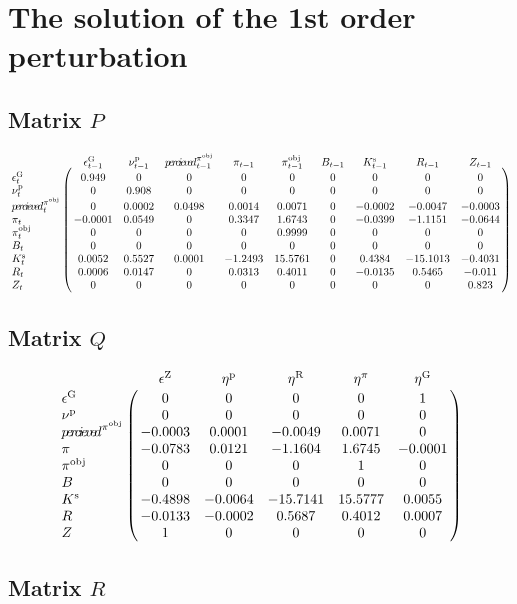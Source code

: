 \section{The solution of the 1st order perturbation}

\subsection*{Matrix $P$}

$$\bordermatrix{
~ & \epsilon^{\mathrm{G}}_{t-1} & \nu^{\mathrm{p}}_{t-1} & {p\!e\!r\!c\!i\!e\!v\!e\!d}^{\pi^{\mathrm{obj}}}_{t-1} & \pi_{t-1} & \pi^{\mathrm{obj}}_{t-1} & B_{t-1} & K^{\mathrm{s}}_{t-1} & R_{t-1} & Z_{t-1} \cr
\epsilon^{\mathrm{G}}_{t} & 0.949 & 0 & 0 & 0 & 0 & 0 & 0 & 0 & 0 \cr
\nu^{\mathrm{p}}_{t} & 0 & 0.908 & 0 & 0 & 0 & 0 & 0 & 0 & 0 \cr
{p\!e\!r\!c\!i\!e\!v\!e\!d}^{\pi^{\mathrm{obj}}}_{t} & 0 & 0.0002 & 0.0498 & 0.0014 & 0.0071 & 0 & -0.0002 & -0.0047 & -0.0003 \cr
\pi_{t} & -0.0001 & 0.0549 & 0 & 0.3347 & 1.6743 & 0 & -0.0399 & -1.1151 & -0.0644 \cr
\pi^{\mathrm{obj}}_{t} & 0 & 0 & 0 & 0 & 0.9999 & 0 & 0 & 0 & 0 \cr
B_{t} & 0 & 0 & 0 & 0 & 0 & 0 & 0 & 0 & 0 \cr
K^{\mathrm{s}}_{t} & 0.0052 & 0.5527 & 0.0001 & -1.2493 & 15.5761 & 0 & 0.4384 & -15.1013 & -0.4031 \cr
R_{t} & 0.0006 & 0.0147 & 0 & 0.0313 & 0.4011 & 0 & -0.0135 & 0.5465 & -0.011 \cr
Z_{t} & 0 & 0 & 0 & 0 & 0 & 0 & 0 & 0 & 0.823 \cr
}$$

\subsection*{Matrix $Q$}

$$\bordermatrix{
~ & \epsilon^{\mathrm{Z}} & \eta^{\mathrm{p}} & \eta^{\mathrm{R}} & \eta^{\pi} & \eta^{\mathrm{G}} \cr
\epsilon^{\mathrm{G}} & 0 & 0 & 0 & 0 & 1 \cr
\nu^{\mathrm{p}} & 0 & 0 & 0 & 0 & 0 \cr
{p\!e\!r\!c\!i\!e\!v\!e\!d}^{\pi^{\mathrm{obj}}} & -0.0003 & 0.0001 & -0.0049 & 0.0071 & 0 \cr
\pi & -0.0783 & 0.0121 & -1.1604 & 1.6745 & -0.0001 \cr
\pi^{\mathrm{obj}} & 0 & 0 & 0 & 1 & 0 \cr
B & 0 & 0 & 0 & 0 & 0 \cr
K^{\mathrm{s}} & -0.4898 & -0.0064 & -15.7141 & 15.5777 & 0.0055 \cr
R & -0.0133 & -0.0002 & 0.5687 & 0.4012 & 0.0007 \cr
Z & 1 & 0 & 0 & 0 & 0 \cr
}$$

\subsection*{Matrix $R$}

